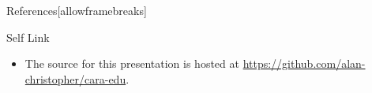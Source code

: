 \documentclass[pdf]{beamer}
\makeatletter
\def\beamer@writeslidentry@miniframesoff{%
  \expandafter\beamer@ifempty\expandafter{\beamer@framestartpage}{}%
  {%
    \clearpage\beamer@notesactions%
  }
}
\newcommand*{\miniframesoff}{\let\beamer@writeslidentry=\beamer@writeslidentry@miniframesoff}
\makeatother
\begin{document}
\miniframesoff
\section*{}
\begin{frame}{References}[allowframebreaks]
    \tiny
    \printbibliography
\end{frame}

\begin{frame}{Self Link}
  \begin{itemize}
  \item The source for this presentation is hosted at
    \url{https://github.com/alan-christopher/cara-edu}.
  \end{itemize}
\end{frame}
\end{document}
